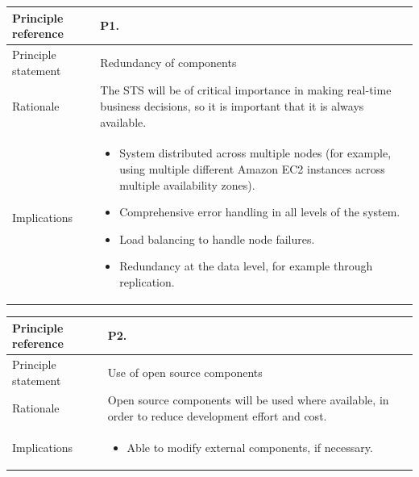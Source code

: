 \documentclass[a4paper,11pt]{report}
\begin{document}
\begin{center}
  \begin{tabular}[h!]{| >{\columncolor{gray}}p{} | p{} |}
    \hline
    Principle reference & P1. \\
    \hline
    Principle statement & Redundancy of components \\
    \hline
    Rationale & The STS will be of critical importance in making real-time business decisions, so it is important that it is always available. \\
    \hline
    Implications & \begin{itemize}
      \item System distributed across multiple nodes (for example, using multiple different Amazon EC2 instances across multiple availability zones).
      \item Comprehensive error handling in all levels of the system.
      \item Load balancing to handle node failures.
      \item Redundancy at the data level, for example through replication.
      \end{itemize}
        \\
    \hline
  \end{tabular}
\end{center}
\begin{center}
  \begin{tabular}[h!]{| >{\columncolor{gray}}p{} | p{} |}
    \hline
    Principle reference & P2. \\
    \hline
    Principle statement & Use of open source components \\
    \hline
    Rationale & Open source components will be used where available, in order to reduce development effort and cost. \\
    \hline
    Implications & \begin{itemize}
      \item Able to modify external components, if necessary.
      \end{itemize}
        \\
    \hline
  \end{tabular}
\end{center}
\end{document}
